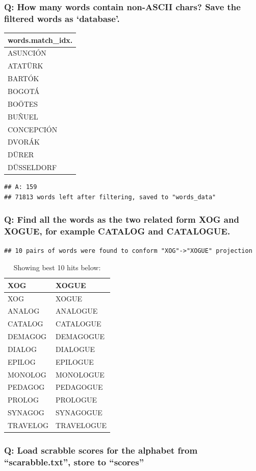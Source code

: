 \documentclass[a4paperpaper,]{article}
\begin{document}
\subsubsection{\texorpdfstring{Q: How many words contain non-ASCII
chars? Save the filtered words as
`database'.}{Q: How many words contain non-ASCII chars? Save the filtered words as database.}}\label{q-how-many-words-contain-non-ascii-chars-save-the-filtered-words-as-database.}

\begin{longtable}[]{@{}l@{}}
\toprule
words.match\_idx.\tabularnewline
\midrule
\endhead
ASUNCIÓN\tabularnewline
ATATÜRK\tabularnewline
BARTÓK\tabularnewline
BOGOTÁ\tabularnewline
BOÖTES\tabularnewline
BUÑUEL\tabularnewline
CONCEPCIÓN\tabularnewline
DVORÁK\tabularnewline
DÜRER\tabularnewline
DÜSSELDORF\tabularnewline
\bottomrule
\end{longtable}

\begin{verbatim}
## A: 159  
## 71813 words left after filtering, saved to "words_data"
\end{verbatim}

\subsubsection{Q: Find all the words as the two related form XOG and
XOGUE, for example CATALOG and
CATALOGUE.}\label{q-find-all-the-words-as-the-two-related-form-xog-and-xogue-for-example-catalog-and-catalogue.}

\begin{verbatim}
## 10 pairs of words were found to conform "XOG"->"XOGUE" projection
\end{verbatim}

\begin{longtable}[]{@{}ll@{}}
\caption{Showing best 10 hits below:}\tabularnewline
\toprule
XOG & XOGUE\tabularnewline
\midrule
\endfirsthead
\toprule
XOG & XOGUE\tabularnewline
\midrule
\endhead
ANALOG & ANALOGUE\tabularnewline
CATALOG & CATALOGUE\tabularnewline
DEMAGOG & DEMAGOGUE\tabularnewline
DIALOG & DIALOGUE\tabularnewline
EPILOG & EPILOGUE\tabularnewline
MONOLOG & MONOLOGUE\tabularnewline
PEDAGOG & PEDAGOGUE\tabularnewline
PROLOG & PROLOGUE\tabularnewline
SYNAGOG & SYNAGOGUE\tabularnewline
TRAVELOG & TRAVELOGUE\tabularnewline
\bottomrule
\end{longtable}

\subsubsection{\texorpdfstring{Q: Load scrabble scores for the alphabet
from ``scarabble.txt'', store to
``scores''}{Q: Load scrabble scores for the alphabet from scarabble.txt, store to scores}}\label{q-load-scrabble-scores-for-the-alphabet-from-scarabble.txt-store-to-scores}
\end{document}
